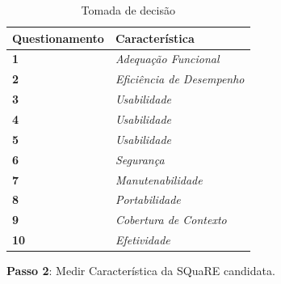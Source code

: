\begin{longtable}{|p{95pt}|p{150pt}|}
 	\caption{Tomada de decisão} 
 	\label{Decisao}\\
 	\hline
 	{\raggedright \textbf{Questionamento}}
 	 	 	 & {\raggedright {\textbf{Característica}}}\\
 	 	\hline
 	 {\raggedright \textbf{1}}
 	 & {\raggedright {\textit{Adequação Funcional}}}\\	
 	\hline
 		{\raggedright \textbf{2}}
 	 	 & {\raggedright \textit{Eficiência de Desempenho}}\\	 	
 	 	\hline
 	 {\raggedright \textbf{3}}
 	 & {\raggedright  \textit{Usabilidade} }\\
 	
 	\hline
 	 {\raggedright \textbf{4}}
 	 & {\raggedright \textit{Usabilidade}} 	
 \\	\hline
 	 {\raggedright \textbf{5}} 
 	 & {\raggedright  \textit{Usabilidade}} \\
	\hline
 	 {\raggedright \textbf{6}}
 	 & {\raggedright \textit{Segurança}} 
 	\\\hline
 	{\raggedright \textbf{7}}
 	 & {\raggedright \textit{Manutenabilidade}}
  	                \\\hline
 	{\raggedright \textbf{8}}
 	 & {\raggedright \textit{Portabilidade}}
 	  \\
 
 	\hline
 	{\raggedright \textbf{9}}
 	 	 & {\raggedright \textit{Cobertura de Contexto}}
 	 	  \\
 	 
 	 	\hline
 	{\raggedright \textbf{10}}
 	 	 & {\raggedright \textit{Efetividade}}
 	 	  \\
 	 
 	 	\hline
 	 
\end{longtable}

\textbf{Passo 2}: Medir Característica da SQuaRE candidata.

